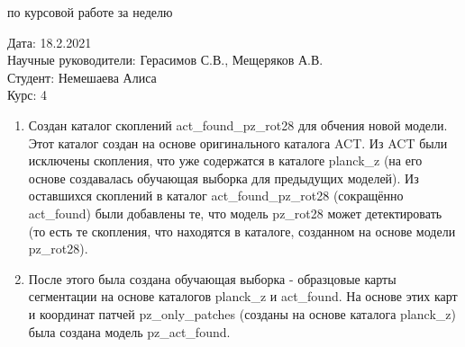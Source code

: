 \documentclass{article}
\begin{document}
\begin{center}{ по курсовой работе за неделю\\}\end{center}
Дата: 18.2.2021\\
Научные руководители: Герасимов С.В., Мещеряков А.В.\\
Студент: Немешаева Алиса\\
Курс: 4\\

\renewcommand{\labelitemi}{$\blacksquare$}
\renewcommand\labelitemii{$\square$}
\begin{enumerate}
    \item Создан каталог скоплений act\_found\_pz\_rot28 для обчения новой модели. Этот каталог 
        создан на основе оригинального каталога ACT. Из ACT были исключены скопления, что уже 
        содержатся в каталоге planck\_z (на его основе создавалась обучающая выборка для предыдущих 
        моделей). Из оставшихся скоплений в каталог act\_found\_pz\_rot28 (сокращённо act\_found) 
        были добавлены те, что модель pz\_rot28 может детектировать (то есть те скопления, что 
        находятся в каталоге, созданном на основе модели pz\_rot28).\\
    \item После этого была создана обучающая выборка - образцовые карты сегментации на основе 
        каталогов planck\_z и act\_found. На основе этих карт и координат патчей pz\_only\_patches
        (созданы на основе каталога planck\_z) была создана модель pz\_act\_found.\\
\end{enumerate}
\end{document}
